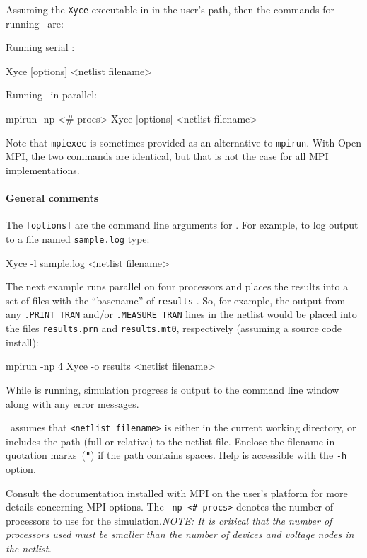 Assuming the \texttt{Xyce} executable in in the user's path, then the
commands for running \Xyce\ are:
\begin{XyceItemize}
\item Running serial \Xyce:
\begin{vquote}
  Xyce [options] <netlist filename>
\end{vquote}
\item Running \Xyce\ in parallel:
\begin{vquote}
  mpirun -np <# procs> Xyce [options] <netlist filename>
\end{vquote}
\end{XyceItemize}
Note that \texttt{mpiexec} is sometimes provided as an alternative to
\texttt{mpirun}. With Open MPI, the two commands are identical, but
that is not the case for all MPI implementations.

\paragraph{General comments}
The \texttt{[options]} are the command line arguments for \Xyce{}.  For example,
to log output to a file named \texttt{sample.log} type:
\begin{vquote}
  Xyce -l sample.log <netlist filename>
\end{vquote}

The next example runs parallel \Xyce{} on four processors and places
the results into a set of files with the ``basename'' of \texttt{results}
.  So, for example, the output from any
\texttt{.PRINT TRAN} and/or \texttt{.MEASURE TRAN} lines in the netlist
would be placed into the files \texttt{results.prn} and \texttt{results.mt0},
respectively (assuming a source code install):
\begin{vquote}
  mpirun -np 4 Xyce -o results <netlist filename>
\end{vquote}

While \Xyce{} is running, simulation progress is output to the
command line window along with any error
messages.  

\Xyce\ assumes that \texttt{<netlist filename>} is either in
the current working directory, or includes the path (full or relative)
to the netlist file.  Enclose the filename in quotation
marks~(\texttt{"}) if the path contains spaces.  Help is accessible with
the \texttt{-h} option.

Consult the documentation installed with MPI on the user's platform for more
details concerning MPI options.  The \texttt{-np <\# procs>} denotes the number
of processors to use for the
simulation.\newline \emph{NOTE: It is critical that the number of processors
used must be smaller than the number of devices and voltage nodes in the
netlist.}

